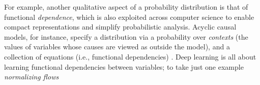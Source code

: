 For example, another qualitative aspect of a probability distribution is that of
functional \emph{dependence}, 
    which is also exploited across computer science to enable compact representations and simplify probabilistic 
    analysis.
%
Acyclic causal models, for instance, specify a distribution  via a
probability over \emph{contexts}
(the values of variables whose causes are viewed as outside the model),
and a collection of equations (i.e., functional dependencies) \citep{pearl:2k}.
Deep learning is all about learning functional dependencies between variables; to take just one example \emph{normalizing flows}
